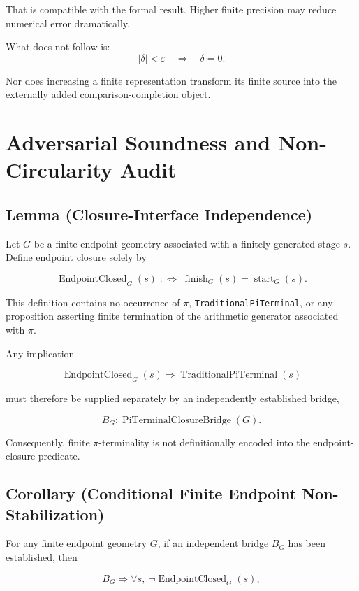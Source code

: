 \documentclass[11pt,a4paper]{article}
\begin{document}
That is compatible with the formal result. Higher finite precision may
reduce numerical error dramatically.

What does not follow is:
\[
|\delta|<\varepsilon
\quad\Longrightarrow\quad
\delta=0.
\]

Nor does increasing a finite representation transform its finite source
into the externally added comparison-completion object.


\section{Adversarial Soundness and Non-Circularity Audit}

\subsection*{Lemma (Closure-Interface Independence)}

Let \(G\) be a finite endpoint geometry associated with a finitely
generated stage \(s\). Define endpoint closure solely by

\[
\operatorname{EndpointClosed}_{G}(s)
\;:\Longleftrightarrow\;
\operatorname{finish}_{G}(s)
=
\operatorname{start}_{G}(s).
\]

This definition contains no occurrence of \(\pi\),
\texttt{TraditionalPiTerminal}, or any proposition asserting finite
termination of the arithmetic generator associated with \(\pi\).

Any implication

\[
\operatorname{EndpointClosed}_{G}(s)
\Longrightarrow
\operatorname{TraditionalPiTerminal}(s)
\]

must therefore be supplied separately by an independently established
bridge,

\[
B_G :
\operatorname{PiTerminalClosureBridge}(G).
\]

Consequently, finite \(\pi\)-terminality is not definitionally encoded
into the endpoint-closure predicate.

\subsection*{Corollary (Conditional Finite Endpoint Non-Stabilization)}

For any finite endpoint geometry \(G\), if an independent bridge
\(B_G\) has been established, then

\[
B_G
\Longrightarrow
\forall s,\;
\neg\operatorname{EndpointClosed}_{G}(s),
\]
\end{document}
